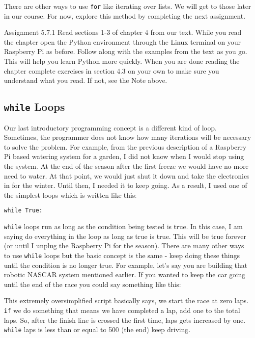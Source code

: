 \documentclass[
]{book}
\begin{document}
There are other ways to use \texttt{for} like iterating over lists. We will get to those later in our course. For now, explore this method by completing the next assignment.

Assignment 5.7.1
Read sections 1-3 of chapter 4 from our text. While you read the chapter open the Python environment through the Linux terminal on your Raspberry Pi as before. Follow along with the examples from the text as you go. This will help you learn Python more quickly. When you are done reading the chapter complete exercises in section 4.3 on your own to make sure you understand what you read. If not, see the Note above.

\hypertarget{while-loops}{%
\subsection{\texorpdfstring{\texttt{while} Loops}{while Loops}}\label{while-loops}}

Our last introductory programming concept is a different kind of loop. Sometimes, the programmer does not know how many iterations will be necessary to solve the problem. For example, from the previous description of a Raspberry Pi based watering system for a garden, I did not know when I would stop using the system. At the end of the season after the first freeze we would have no more need to water. At that point, we would just shut it down and take the electronics in for the winter. Until then, I needed it to keep going. As a result, I used one of the simplest loops which is written like this:

\texttt{while\ True:}

\texttt{while} loops run as long as the condition being tested is true. In this case, I am saying do everything in the loop as long as true is true. This will be true forever (or until I unplug the Raspberry Pi for the season). There are many other ways to use \texttt{while} loops but the basic concept is the same - keep doing these things until the condition is no longer true. For example, let's say you are building that robotic NASCAR system mentioned earlier. If you wanted to keep the car going until the end of the race you could say something like this:

This extremely oversimplified script basically says, we start the race at zero laps. \texttt{if} we do something that means we have completed a lap, add one to the total laps. So, after the finish line is crossed the first time, laps gets increased by one. \texttt{while} laps is less than or equal to 500 (the end) keep driving.
\end{document}
